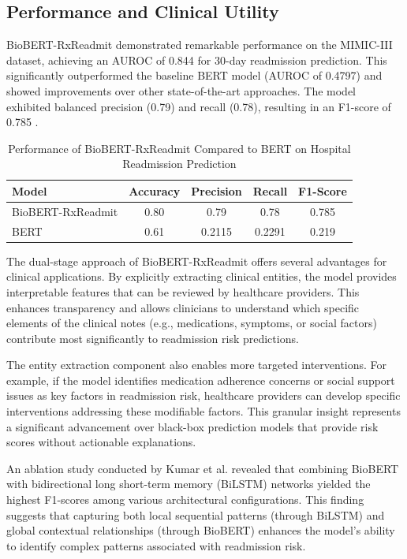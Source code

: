 \documentclass[3p,times,procedia]{elsarticle}
\begin{document}
\subsection{Performance and Clinical Utility}

BioBERT-RxReadmit demonstrated remarkable performance on the MIMIC-III dataset, achieving an AUROC of 0.844 for 30-day readmission prediction. This significantly outperformed the baseline BERT model (AUROC of 0.4797) and showed improvements over other state-of-the-art approaches. The model exhibited balanced precision (0.79) and recall (0.78), resulting in an F1-score of 0.785 \cite{Kumar2025}.

\begin{table}[h]
\centering
\caption{Performance of BioBERT-RxReadmit Compared to BERT on Hospital Readmission Prediction}
\label{tab:biobert_performance}
\begin{tabular}{|l|c|c|c|c|}
\hline
\textbf{Model} & \textbf{Accuracy} & \textbf{Precision} & \textbf{Recall} & \textbf{F1-Score} \\ \hline
BioBERT-RxReadmit & 0.80 & 0.79 & 0.78 & 0.785 \\ \hline
BERT & 0.61 & 0.2115 & 0.2291 & 0.219 \\ \hline
\end{tabular}
\end{table}

The dual-stage approach of BioBERT-RxReadmit offers several advantages for clinical applications. By explicitly extracting clinical entities, the model provides interpretable features that can be reviewed by healthcare providers. This enhances transparency and allows clinicians to understand which specific elements of the clinical notes (e.g., medications, symptoms, or social factors) contribute most significantly to readmission risk predictions.

The entity extraction component also enables more targeted interventions. For example, if the model identifies medication adherence concerns or social support issues as key factors in readmission risk, healthcare providers can develop specific interventions addressing these modifiable factors. This granular insight represents a significant advancement over black-box prediction models that provide risk scores without actionable explanations.

An ablation study conducted by Kumar et al. \cite{Kumar2025} revealed that combining BioBERT with bidirectional long short-term memory (BiLSTM) networks yielded the highest F1-scores among various architectural configurations. This finding suggests that capturing both local sequential patterns (through BiLSTM) and global contextual relationships (through BioBERT) enhances the model's ability to identify complex patterns associated with readmission risk.
\end{document}
